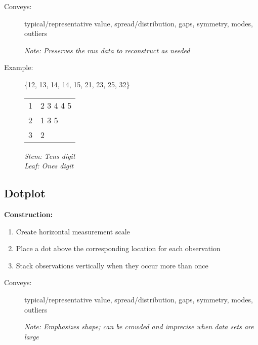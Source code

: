 \documentclass[12pt]{article}
\begin{document}
    \begin{description}
        \item[Conveys:] typical/representative value, spread/distribution, gaps, symmetry, modes, outliers
        \item[] \textit{Note: Preserves the raw data to reconstruct as needed} 
    \end{description}

\begin{description}
\item[Example:] \{12, 13, 14, 14, 15, 21, 23, 25, 32\}

\begin{flushleft}
\begin{minipage}{0.55\linewidth}
\begin{tabular}{r|l}
1 & 2 3 4 4 5 \\
2 & 1 3 5 \\
3 & 2 \\
\end{tabular}
\end{minipage}%
\hfill
\begin{minipage}{0.4\linewidth}
\textit{Stem: Tens digit} \\
\textit{Leaf: Ones digit}
\end{minipage}
\end{flushleft}

\end{description}

\subsection{Dotplot}
    \textbf{Construction:}
    \begin{enumerate} 
        \item Create horizontal measurement scale
        \item Place a dot above the corresponding location for each observation
        \item Stack observations vertically when they occur more than once
    \end{enumerate}

    \begin{description}
        \item[Conveys:] typical/representative value, spread/distribution, gaps, symmetry, modes, outliers
        \item[] \textit{Note: Emphasizes shape; can be crowded and imprecise when data sets are large} 
    \end{description}
\end{document}
